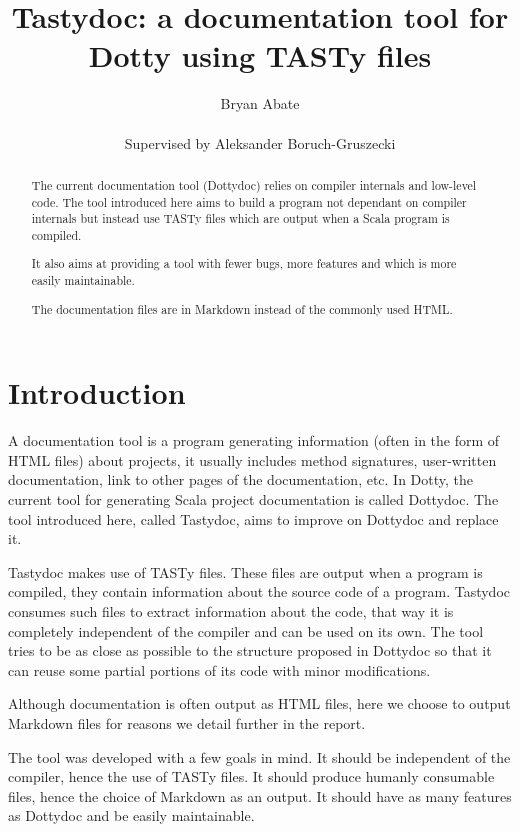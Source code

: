 \documentclass{report}
\begin{document}
\title{Tastydoc: a documentation tool for Dotty using TASTy files}
\author{Bryan Abate
\\\\\small{Supervised by Aleksander Boruch-Gruszecki}}

\maketitle

\begin{abstract}
The current documentation tool (Dottydoc) relies on compiler internals and low-level code. The tool introduced here aims to build a program not dependant on compiler internals but instead use TASTy files which are output when a Scala program is compiled.

It also aims at providing a tool with fewer bugs, more features and which is more easily maintainable.

The documentation files are in Markdown instead of the commonly used HTML.
\end{abstract}

\tableofcontents

\chapter{Introduction}

A documentation tool is a program generating information (often in the form of HTML files) about projects, it usually includes method signatures, user-written documentation, link to other pages of the documentation, etc.
In Dotty, the current tool for generating Scala project documentation is called Dottydoc. The tool introduced here, called Tastydoc, aims to improve on Dottydoc and replace it.

Tastydoc makes use of TASTy files. These files are output when a program is compiled, they contain information about the source code of a program. Tastydoc consumes such files to extract information about the code, that way it is completely independent of the compiler and can be used on its own.
The tool tries to be as close as possible to the structure proposed in Dottydoc so that it can reuse some partial portions of its code with minor modifications.

Although documentation is often output as HTML files, here we choose to output Markdown files for reasons we detail further in the report.

The tool was developed with a few goals in mind. It should be independent of the compiler, hence the use of TASTy files. It should produce humanly consumable files, hence the choice of Markdown as an output. It should have as many features as Dottydoc and be easily maintainable.
\end{document}
